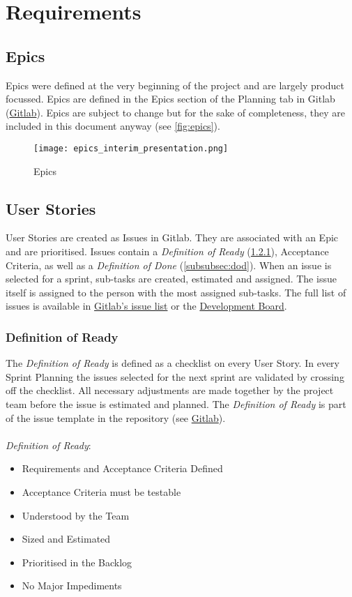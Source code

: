 \section{Requirements}
\subsection{Epics}
Epics were defined at the very beginning of the project and are largely product focussed.
Epics are defined in the Epics section of the Planning tab in Gitlab (\href{https://gitlab.ti.bfh.ch/groups/decibel-threshold-event-displayer/-/epics}{Gitlab}). Epics are subject to change
but for the sake of completeness, they are included in this document anyway (see \autoref{fig:epics}).
\begin{figure}[H]
    \centering
    \texttt{[image: epics\_interim\_presentation.png]}
    \caption{Epics}\label{fig:epics}
\end{figure}
\subsection{User Stories}
User Stories are created as Issues in Gitlab. They are associated with an Epic and are prioritised. Issues contain a \textit{Definition of Ready} (\ref{subsubsec:dor}), Acceptance Criteria, as well as a \textit{Definition of Done} (\ref{subsubsec:dod}).
When an issue is selected for a sprint, sub-tasks are created, estimated and assigned. The issue itself is assigned to the person with the most assigned sub-tasks. The full list of issues is available in \href{https://gitlab.ti.bfh.ch/groups/decibel-threshold-event-displayer/-/issues}{Gitlab's issue list} or the \href{https://gitlab.ti.bfh.ch/decibel-threshold-event-displayer/decibel-threshold-event-displayer/-/boards/2832}{Development Board}.

\subsubsection{Definition of Ready}\label{subsubsec:dor}
The \textit{Definition of Ready} is defined as a checklist on every User Story. In every Sprint Planning the issues selected for
the next sprint are validated by crossing off the checklist. All necessary adjustments are made together by the project team before the issue is
estimated and planned. The \textit{Definition of Ready} is part of the issue template in the repository
(see \href{https://gitlab.ti.bfh.ch/decibel-threshold-event-displayer/decibel-threshold-event-displayer/-/blob/main/.gitlab/issue_templates/User\%20Story.md}{Gitlab}). \\ \\
\textit{Definition of Ready}:
\begin{itemize}
    \item Requirements and Acceptance Criteria Defined
    \item Acceptance Criteria must be testable
    \item Understood by the Team
    \item Sized and Estimated
    \item Prioritised in the Backlog
    \item No Major Impediments
\end{itemize}
